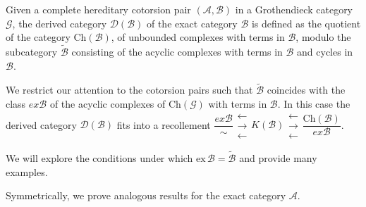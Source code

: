 Given a complete hereditary cotorsion pair $(\mathcal{A},\mathcal{B})$ in a Grothendieck category $\mathcal{G}$,
the derived category $\mathcal{D}(\mathcal{B})$ of the exact category $\mathcal{B}$ is defined as the quotient of the category $\mathrm{Ch}(\mathcal{B})$, of unbounded complexes with terms in $\mathcal{B}$, modulo the subcategory $\widetilde{\mathcal{B}}$ consisting of the acyclic complexes with terms in $\mathcal{B}$ and cycles in $\mathcal{B}$.


We restrict our attention to the cotorsion pairs such that
$\widetilde{\mathcal{B}}$ coincides with the class $ex\mathcal{B}$ of the acyclic complexes of $\mathrm{Ch}(\mathcal{G})$ with terms in $\mathcal{B}$. In this case the derived category $\mathcal{D}(\mathcal{B})$
fits into a recollement
$\dfrac{ex\mathcal{B}}{\sim}
  \mathrel{\substack{\textstyle\leftarrow\\\textstyle\rightarrow\\\textstyle\leftarrow}}
  {K(\mathcal{B})}
  \mathrel{\substack{\textstyle\leftarrow\\\textstyle\rightarrow\\\textstyle\leftarrow}}
{\dfrac{\mathrm{Ch}(\mathcal{B})}{ex\mathcal{B} }}$.

We will explore the conditions under which $\mathrm{ex}\,\mathcal{B}=\widetilde{\mathcal{B}}$ and provide many examples.

Symmetrically, we prove analogous results for the exact category $\mathcal{A}$.

